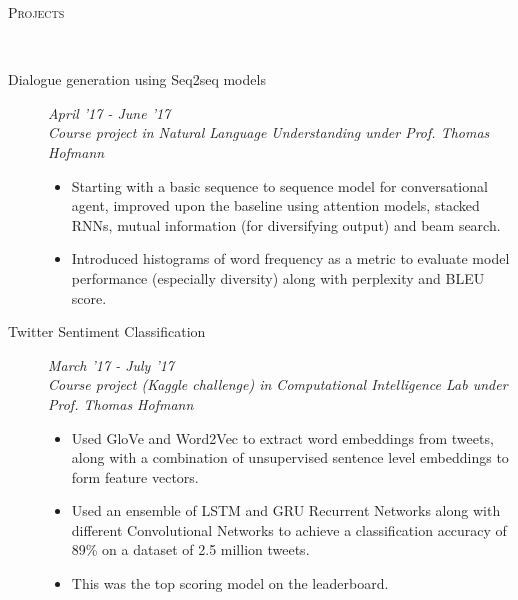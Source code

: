 \documentclass[9pt]{article}
\newenvironment{changemargin}[2]{%
  \begin{list}{}{%
      \setlength{\topsep}{0pt}%
    \setlength{\leftmargin}{#1}%
    \setlength{\rightmargin}{#2}%
    \setlength{\listparindent}{\parindent}%
  \setlength{\itemindent}{\parindent}%
    \setlength{\parsep}{\parskip}%
    }%
  \item[]}{\end{list}
    }
\newcommand{\lineover}{
  \begin{changemargin}{-0.05in}{-0.10in}
    \vspace*{-9pt}
    \hrulefill \\
    \vspace*{-2pt}
  \end{changemargin}
}
\newcommand{\header}[1]{
  \begin{changemargin}{-0.5in}{-0.5in}
    \scshape{#1}\\
        \lineover
  \end{changemargin}
}
\newenvironment{body} {
  \vspace*{-16pt}
        \begin{changemargin}{-0.6in}{-0.65in}
        }	
        {\end{changemargin}
}
\begin{document}
\header{Projects}
\begin{body}
  \vspace{14pt}

  \begin{description}
    \item[\normalsize{Dialogue generation using Seq2seq models}] \hfill \textit{April '17 - June '17} \\
      \textit{Course project in Natural Language Understanding under Prof. Thomas Hofmann}
      \begin{itemize}
        \item Starting with a basic sequence to sequence model for conversational
          agent, improved upon the baseline using attention models, stacked RNNs,
          mutual information (for diversifying output) and beam search.
        \item Introduced histograms of word frequency as a metric to evaluate 
          model performance (especially diversity) along with perplexity and BLEU 
          score.
      \end{itemize}


    \item[\normalsize{Twitter Sentiment Classification}] \hfill \textit{March '17 - July '17} \\
      \textit{Course project (Kaggle challenge) in Computational Intelligence Lab
      under Prof. Thomas Hofmann}
      \begin{itemize}
        \item Used GloVe and Word2Vec to extract word embeddings from tweets, 
          along with a combination of unsupervised sentence level embeddings to
          form feature vectors.
        \item Used an ensemble of LSTM and GRU Recurrent Networks along with 
          different Convolutional Networks to achieve a classification accuracy
          of 89\% on a dataset of 2.5 million tweets. 
        \item This was the top scoring model on the leaderboard. 
      \end{itemize}


\end{description}
\end{body}
\end{document}
